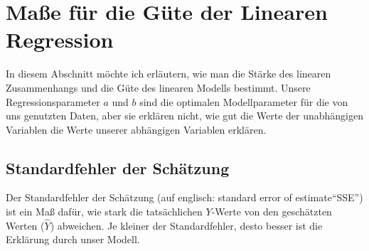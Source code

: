 \documentclass[ngerman, 12pt]{scrartcl}
\begin{document}
\begin{center}
\vspace*{1em}
\label{fig:final}\vspace*{1em}
\end{center}

\section{Maße für die Güte der Linearen Regression}

In diesem Abschnitt möchte ich erläutern, wie man die Stärke des linearen Zusammenhangs und die Güte des linearen Modells bestimmt. Unsere Regressionsparameter \(a\) und \(b\) sind die optimalen Modellparameter für die von uns genutzten Daten, aber sie erklären nicht, wie gut die Werte der unabhängigen Variablen die Werte unserer abhängigen Variablen erklären.

\subsection{Standardfehler der Schätzung}

Der Standardfehler der Schätzung (auf englisch: standard error of estimate\enquote{SSE}) ist ein Maß dafür, wie stark die tatsächlichen \(Y\)-Werte von den geschätzten Werten (\(\hat{Y}\)) abweichen. Je kleiner der Standardfehler, desto besser ist die Erklärung durch unser Modell. 
\end{document}
